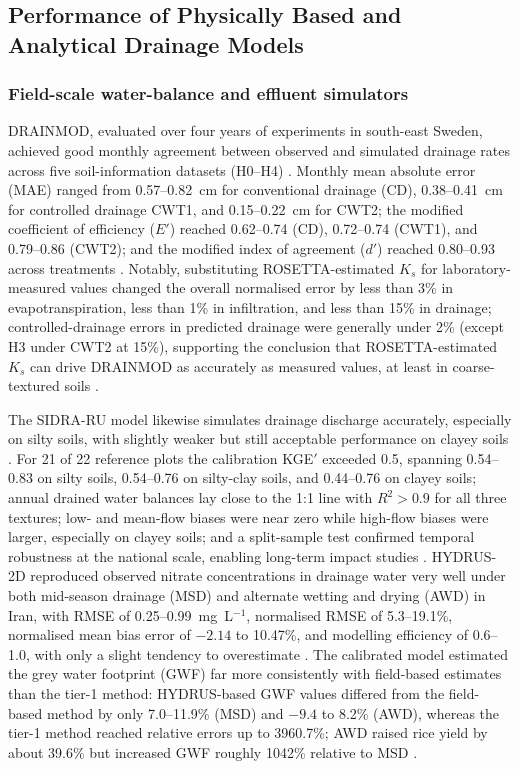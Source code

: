 \subsection{Performance of Physically Based and Analytical Drainage Models}

\subsubsection{Field-scale water-balance and effluent simulators}

DRAINMOD, evaluated over four years of experiments in south-east Sweden,
achieved good monthly agreement between observed and simulated drainage rates
across five soil-information datasets (H0--H4) \parencite{Salazar2008}. Monthly
mean absolute error (MAE) ranged from 0.57--0.82~cm for conventional drainage
(CD), 0.38--0.41~cm for controlled drainage CWT1, and 0.15--0.22~cm for CWT2;
the modified coefficient of efficiency ($E'$) reached 0.62--0.74 (CD),
0.72--0.74 (CWT1), and 0.79--0.86 (CWT2); and the modified index of agreement
($d'$) reached 0.80--0.93 across treatments \parencite{Salazar2008}. Notably,
substituting ROSETTA-estimated $K_s$ for laboratory-measured values changed the
overall normalised error by less than 3\% in evapotranspiration, less than 1\%
in infiltration, and less than 15\% in drainage; controlled-drainage errors in
predicted drainage were generally under 2\% (except H3 under CWT2 at 15\%),
supporting the conclusion that ROSETTA-estimated $K_s$ can drive DRAINMOD as
accurately as measured values, at least in coarse-textured soils
\parencite{Salazar2008}.

The SIDRA-RU model likewise simulates drainage discharge accurately, especially
on silty soils, with slightly weaker but still acceptable performance on clayey
soils \parencite{Jeantet2021}. For 21 of 22 reference plots the calibration
KGE$'$ exceeded 0.5, spanning 0.54--0.83 on silty soils, 0.54--0.76 on
silty-clay soils, and 0.44--0.76 on clayey soils; annual drained water balances
lay close to the 1:1 line with $R^2>0.9$ for all three textures; low- and
mean-flow biases were near zero while high-flow biases were larger, especially
on clayey soils; and a split-sample test confirmed temporal robustness at the
national scale, enabling long-term impact studies \parencite{Jeantet2021}.
HYDRUS-2D reproduced observed nitrate concentrations in drainage water very well
under both mid-season drainage (MSD) and alternate wetting and drying (AWD) in
Iran, with RMSE of 0.25--0.99~mg~L$^{-1}$, normalised RMSE of 5.3--19.1\%,
normalised mean bias error of $-2.14$ to 10.47\%, and modelling efficiency of
0.6--1.0, with only a slight tendency to overestimate \parencite{Naderi2025}.
The calibrated model estimated the grey water footprint (GWF) far more
consistently with field-based estimates than the tier-1 method: HYDRUS-based GWF
values differed from the field-based method by only 7.0--11.9\% (MSD) and
$-9.4$ to 8.2\% (AWD), whereas the tier-1 method reached relative errors up to
3960.7\%; AWD raised rice yield by about 39.6\% but increased GWF roughly
1042\% relative to MSD \parencite{Naderi2025}.


